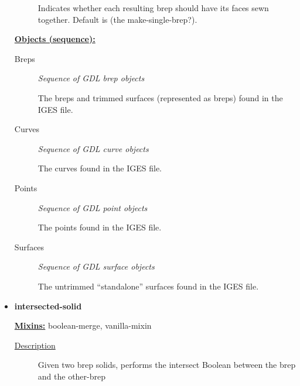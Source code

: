 \documentclass [11pt]{book}
\begin{document}
\begin{itemize}
\begin{description}
 Indicates whether each resulting brep should have its faces sewn together. Default is (the make-single-brep?).




\end{description}






\textbf{
\underline{Objects (sequence):}}

\begin{description}

\item [Breps]
\emph{Sequence of GDL brep objects}

 The breps and trimmed surfaces (represented as breps) found in the IGES file.




\item [Curves]
\emph{Sequence of GDL curve objects}

 The curves found in the IGES file.




\item [Points]
\emph{Sequence of GDL point objects}

 The points found in the IGES file.




\item [Surfaces]
\emph{Sequence of GDL surface objects}

 The untrimmed ``standalone'' surfaces found in the IGES file.




\end{description}







\item {}
\label{prim:intersected-solid}
\textbf{intersected-solid}


\textbf{
\underline{Mixins:}} boolean-merge, vanilla-mixin





\begin{description}

\item [
\underline{Description}]


Given two brep solids, performs the intersect Boolean between the brep and the other-brep




\end{description}
\end{itemize}
\end{document}
